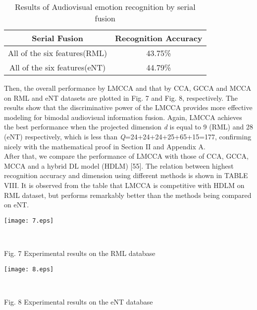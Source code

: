 \documentclass[journal]{IEEEtran}
\begin{document}
\vspace*{-10pt}
\begin{table}[h]
\small
\renewcommand{\arraystretch}{1.4}
\caption{\normalsize{Results of Audiovisual emotion recognition by serial fusion}}
\setlength{\abovecaptionskip}{0pt}
\setlength{\belowcaptionskip}{10pt}
\centering
\tabcolsep 0.07in
\begin{tabular}{cc}
\hline
Serial Fusion & Recognition Accuracy\\
\hline
 All of the six features(RML) &43.75\%\\
 All of the six features(eNT) &44.79\%\\
\hline
\end{tabular}
\end{table}
Then, the overall performance by LMCCA and that by CCA, GCCA and MCCA on RML and eNT datasets are plotted in Fig. 7 and Fig. 8, respectively. The results show that the discriminative power of the LMCCA provides more effective modeling for bimodal audiovisual information fusion. Again, LMCCA achieves the best performance when the projected dimension \emph{d} is equal to 9 (RML) and 28 (eNT) respectively, which is less than \emph{Q}=24+24+24+25+65+15=177, confirming nicely with the mathematical proof in Section II and Appendix A.\\\indent After that, we compare the performance of LMCCA with those of CCA, GCCA, MCCA and a hybrid DL model (HDLM) [55]. The relation between highest recognition accuracy and dimension using different methods is shown in TABLE VIII. It is observed from the table that LMCCA is competitive with HDLM on RML dataset, but performs remarkably better than the methods being compared on eNT.
\centerline {\texttt{[image: 7.eps]}}\\  \centerline {Fig. 7 Experimental results on the RML database}
\centerline {\texttt{[image: 8.eps]}}\\  \centerline {Fig. 8 Experimental results on the eNT database}\\\indent
\vspace*{-10pt}
\end{document}
